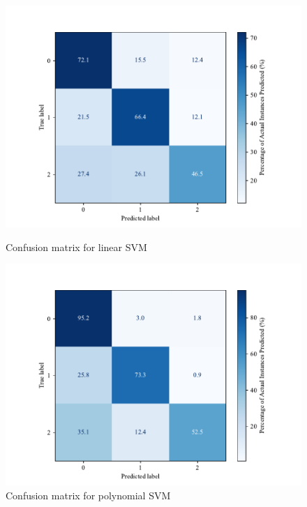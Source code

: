     \begin{figure}[H]
        \centering
        \begin{minipage}[b]{0.45\textwidth}
          \centering
          \includegraphics[width=\textwidth]{images/confusion_matrix_linear_svm.pdf}
          \caption{Confusion matrix for linear SVM}
          \label{fig:confusion_linear}
        \end{minipage}
        \hfill
        \begin{minipage}[b]{0.45\textwidth}
          \centering
          \includegraphics[width=\textwidth]{images/confusion_matrix_poly_svm.pdf}
          \caption{Confusion matrix for polynomial SVM}
          \label{fig:confusion_poly}
        \end{minipage}
        \end{figure}
        
